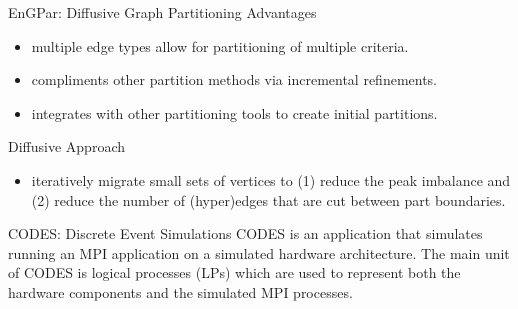 \documentclass{beamer}
\begin{document}
\begin{textblock}{15.6}
\begin{textblock}{5}
\begin{block}{\centering EnGPar: Diffusive Graph Partitioning}
      Advantages
      \begin{itemize}
      \item multiple edge types allow for partitioning of multiple criteria.
      \item compliments other partition methods via incremental refinements.
      \item integrates with other partitioning tools to create initial partitions.
      \end{itemize}
      
      Diffusive Approach
      \begin{itemize}
      \item iteratively migrate small sets of vertices to (1) reduce the peak imbalance and (2) reduce the number of (hyper)edges that are cut between part boundaries.
      \end{itemize}
    \end{block}
    \begin{block}{\centering CODES: Discrete Event Simulations}
      CODES is an application that simulates running an MPI application on a simulated
      hardware architecture. The main unit of CODES is logical processes (LPs) which are used
      to represent both the hardware components and the simulated MPI processes. \\


\end{block}
\end{textblock}
\end{textblock}
\end{document}
